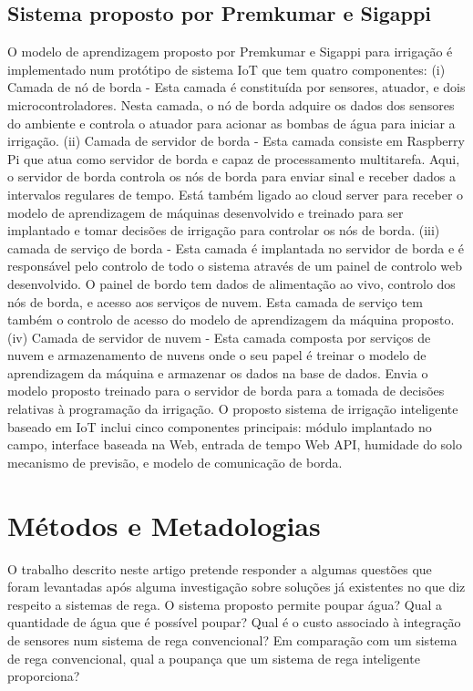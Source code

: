 \documentclass[conference]{IEEEtran}
\begin{document}
\subsection{Sistema proposto por Premkumar e Sigappi}

O modelo de aprendizagem proposto por Premkumar e Sigappi \cite{premkumar2022iot} para irrigação é implementado num protótipo
de sistema IoT que tem quatro componentes: (i) Camada de nó de borda -
Esta camada é constituída por sensores, atuador, e dois microcontroladores.
Nesta camada, o nó de borda adquire os dados dos sensores do ambiente e controla
o atuador para acionar as bombas de água para iniciar a irrigação.
(ii) Camada de servidor de borda - Esta camada consiste em Raspberry Pi que
atua como servidor de borda e capaz de processamento multitarefa. Aqui, o
servidor de borda controla os nós de borda para enviar sinal e receber dados
a intervalos regulares de tempo. Está também ligado ao cloud server para receber
o modelo de aprendizagem de máquinas desenvolvido e treinado para ser implantado
e tomar decisões de irrigação para controlar os nós de borda.
(iii) camada de serviço de borda - Esta camada é implantada no servidor de
borda e é responsável pelo controlo de todo o sistema através de um painel de
controlo web desenvolvido. O painel de bordo tem dados de alimentação ao vivo,
controlo dos nós de borda, e acesso aos serviços de nuvem. Esta camada de
serviço tem também o controlo de acesso do modelo de aprendizagem da máquina
proposto. (iv) Camada de servidor de nuvem - Esta camada composta por serviços
de nuvem e armazenamento de nuvens onde o seu papel é treinar o modelo de
aprendizagem da máquina e armazenar os dados na base de dados. Envia o modelo
proposto treinado para o servidor de borda para a tomada de decisões relativas
à programação da irrigação. O proposto sistema de irrigação inteligente baseado
em IoT inclui cinco componentes principais: módulo implantado no campo,
interface baseada na Web, entrada de tempo Web API, humidade do solo
mecanismo de previsão, e modelo de comunicação de borda.


\section{Métodos e Metadologias}

O trabalho descrito neste artigo pretende responder a algumas questões que foram
levantadas após alguma investigação sobre soluções já existentes no que diz respeito
a sistemas de rega. O sistema proposto permite poupar água? Qual a quantidade de água
que é possível poupar?  Qual é o custo associado à integração de sensores num sistema
de rega convencional? Em comparação com um sistema de rega convencional,
qual a poupança que um sistema de rega inteligente proporciona?
\end{document}
